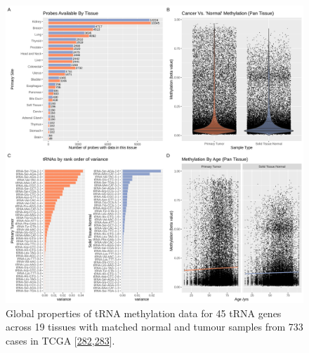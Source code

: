 \documentclass[
]{book}
\begin{document}
\begin{figure}

{\centering \includegraphics[width=1\linewidth]{./figs/cancerVsNormalCombinedPlots} 

}

\caption{Global properties of tRNA methylation data for 45 tRNA genes across 19 tissues with matched normal and tumour samples from 733 cases in TCGA {[}\protect\hyperlink{ref-Yang2016}{282},\protect\hyperlink{ref-Nazor2012}{283}{]}.}\label{fig:cancerVsNormalCombinedPlots}
\end{figure}
\end{document}
